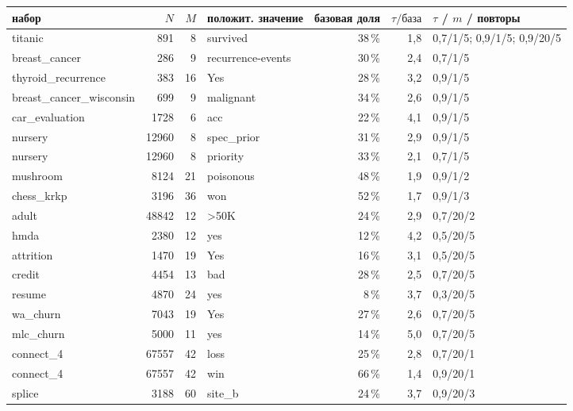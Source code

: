 \begin{tabular}{lrrlrrl}
\toprule
набор & $N$ & $M$ & положит. значение & базовая доля & $\tau/\text{база}$ & $\tau$ / $m$ / повторы\\
\midrule
titanic & 891 & 8 & survived & 38\,\% & 1{,}8 & 0{,}7/1/5; 0{,}9/1/5; 0{,}9/20/5\\
breast\_cancer & 286 & 9 & recurrence-events & 30\,\% & 2{,}4 & 0{,}7/1/5\\
thyroid\_recurrence & 383 & 16 & Yes & 28\,\% & 3{,}2 & 0{,}9/1/5\\
breast\_cancer\_wisconsin & 699 & 9 & malignant & 34\,\% & 2{,}6 & 0{,}9/1/5\\
car\_evaluation & 1728 & 6 & acc & 22\,\% & 4{,}1 & 0{,}9/1/5\\
nursery & 12960 & 8 & spec\_prior & 31\,\% & 2{,}9 & 0{,}9/1/5\\
nursery & 12960 & 8 & priority & 33\,\% & 2{,}1 & 0{,}7/1/5\\
mushroom & 8124 & 21 & poisonous & 48\,\% & 1{,}9 & 0{,}9/1/2\\
chess\_krkp & 3196 & 36 & won & 52\,\% & 1{,}7 & 0{,}9/1/3\\
adult & 48842 & 12 & \textgreater{}50K & 24\,\% & 2{,}9 & 0{,}7/20/2\\
hmda & 2380 & 12 & yes & 12\,\% & 4{,}2 & 0{,}5/20/5\\
attrition & 1470 & 19 & Yes & 16\,\% & 3{,}1 & 0{,}5/20/5\\
credit & 4454 & 13 & bad & 28\,\% & 2{,}5 & 0{,}7/20/5\\
resume & 4870 & 24 & yes & 8\,\% & 3{,}7 & 0{,}3/20/5\\
wa\_churn & 7043 & 19 & Yes & 27\,\% & 2{,}6 & 0{,}7/20/5\\
mlc\_churn & 5000 & 11 & yes & 14\,\% & 5{,}0 & 0{,}7/20/5\\
connect\_4 & 67557 & 42 & loss & 25\,\% & 2{,}8 & 0{,}7/20/1\\
connect\_4 & 67557 & 42 & win & 66\,\% & 1{,}4 & 0{,}9/20/1\\
splice & 3188 & 60 & site\_b & 24\,\% & 3{,}7 & 0{,}9/20/3\\
\bottomrule
\end{tabular}
